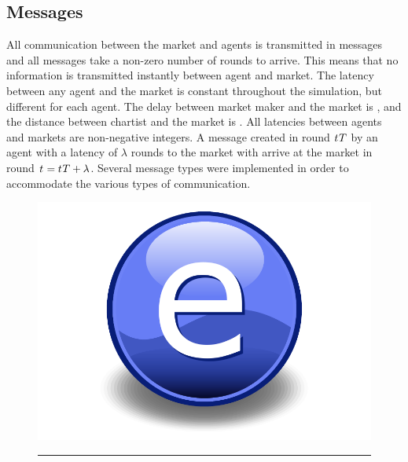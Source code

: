 \subsection{Messages}
All communication between the market and agents is transmitted in messages and all messages take a non-zero number of rounds to arrive. This means that no information is transmitted instantly between agent and market. The latency between any agent and the market is constant throughout the simulation, but different for each agent. The delay between market maker  and the market is , and the distance between chartist  and the market is . All latencies between agents and markets are non-negative integers. A message created in round $t_{}{T}$ by an agent with a latency of $\lambda$ rounds to the market with arrive at the market in round $t_{} = t_{}{T} + \lambda$. Several message types were implemented in order to accommodate the various types of communication.

\begin{figure}[htbp]
	\centering
		\includegraphics{Figures/Electron.pdf}
		\rule{35em}{0.5pt}
	\caption{}
	\label{fig:information_exchange}
\end{figure}


